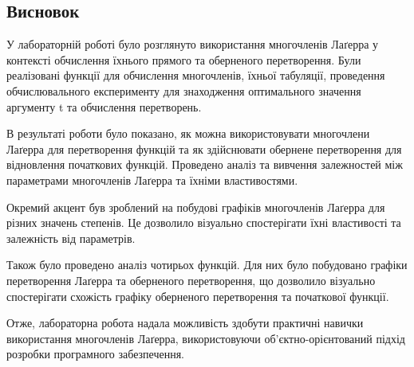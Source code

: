\documentclass[11pt]{article}
\begin{document}
    \subsection*{Висновок}\label{ux432ux438ux441ux43dux43eux432ux43eux43a}

У лабораторній роботі було розглянуто використання многочленів Лаґерра у
контексті обчислення їхнього прямого та оберненого перетворення. Були
реалізовані функції для обчислення многочленів, їхньої табуляції,
проведення обчислювального експерименту для знаходження оптимального
значення аргументу t та обчислення перетворень.

В результаті роботи було показано, як можна використовувати многочлени
Лаґерра для перетворення функцій та як здійснювати обернене перетворення
для відновлення початкових функцій. Проведено аналіз та вивчення
залежностей між параметрами многочленів Лаґерра та їхніми властивостями.

Окремий акцент був зроблений на побудові графіків многочленів Лаґерра
для різних значень степенів. Це дозволило візуально спостерігати їхні
властивості та залежність від параметрів.

Також було проведено аналіз чотирьох функцій. Для них було побудовано
графіки перетворення Лаґерра та оберненого перетворення, що дозволило
візуально спостерігати схожість графіку оберненого перетворення та
початкової функції.

Отже, лабораторна робота надала можливість здобути практичні навички
використання многочленів Лаґерра, використовуючи об'єктно-орієнтований
підхід розробки програмного забезпечення.


    
    
    
\end{document}
